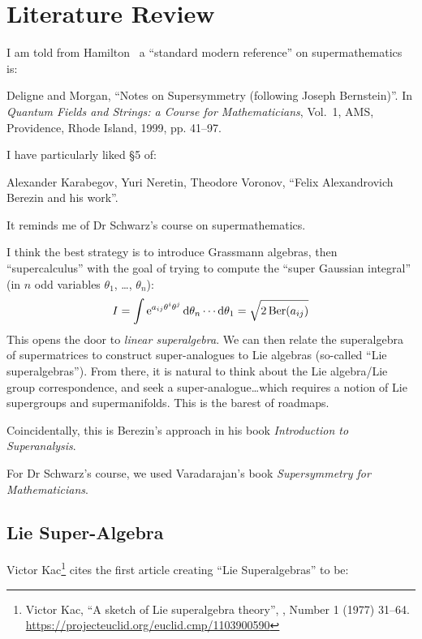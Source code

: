 \section{Literature Review}

I am told from Hamilton~ a ``standard modern
reference'' on supermathematics is:
\begin{enumerate}[label={[\arabic*]}]
\item Deligne and Morgan,
  ``Notes on Supersymmetry (following Joseph Bernstein)''.
  In \textit{Quantum Fields and Strings: a Course for Mathematicians}, Vol.~1, AMS, Providence, Rhode Island, 1999, pp. 41--97.
\end{enumerate}
I have particularly liked \S5 of:
\begin{enumerate}[resume,label={[\arabic*]}]
\item Alexander Karabegov, Yuri Neretin, Theodore Voronov,
  ``Felix Alexandrovich Berezin and his work''.
\end{enumerate}
It reminds me of Dr Schwarz's course on supermathematics.

I think the best strategy is to introduce Grassmann algebras, then
``supercalculus'' with the goal of trying to compute the ``super
Gaussian integral'' (in $n$ odd variables $\theta_{1}$, \dots, $\theta_{n}$):
\begin{equation}
I = \int\mathrm{e}^{a_{ij}\theta^{i}\theta^{j}}\,\mathrm{d}\theta_{n}\cdots\mathrm{d}\theta_{1}
= \sqrt{2\operatorname{Ber}(a_{ij})}
\end{equation}
This opens the door to \emph{linear superalgebra}. We can then relate
the superalgebra of supermatrices to construct super-analogues to Lie
algebras (so-called ``Lie superalgebras''). From there, it is natural to
think about the Lie algebra/Lie group correspondence, and seek a
super-analogue\dots which requires a notion of Lie supergroups and
supermanifolds. This is the barest of roadmaps.

Coincidentally, this is Berezin's approach in his book
\textit{Introduction to Superanalysis}.

For Dr Schwarz's course, we used Varadarajan's book
\textit{Supersymmetry for Mathematicians}.

\subsection{Lie Super-Algebra}

Victor Kac\footnote{Victor Kac, ``A sketch of Lie superalgebra theory'',  , Number 1 (1977) 31--64. \url{https://projecteuclid.org/euclid.cmp/1103900590}} cites the first article
creating ``Lie Superalgebras'' to be:


